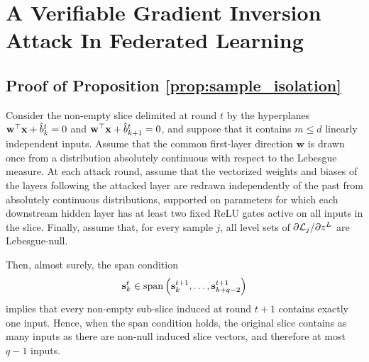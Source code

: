 \chapter{A Verifiable Gradient Inversion Attack In Federated Learning}

\section{Proof of Proposition \ref{prop:sample_isolation}}
\label{app:proof_prop1}

\begin{proposition}
Consider the non-empty slice delimited at round $t$ by the hyperplanes
$\mathbf w^\top {\mathbf{x}}+\hat b_k^t=0$ and $\mathbf w^\top {\mathbf{x}}+\hat b_{k+1}^t=0$,
and suppose that it contains $m\le d$ linearly independent inputs. Assume that
the common first-layer direction $\mathbf w$ is drawn once from a distribution
absolutely continuous with respect to the Lebesgue measure. At each attack round,
assume that the vectorized weights and biases of the layers following the
attacked layer are redrawn independently of the past from absolutely continuous
distributions, supported on parameters for which each downstream hidden layer
has at least two fixed ReLU gates active on all inputs in the slice. Finally,
assume that, for every sample $j$, all level sets of
$\partial \mathcal{L}_j/\partial z^L$ are Lebesgue-null.

Then, almost surely, the span condition
\[
\mathbf{s}_k^t
\in
\operatorname{span}\left(
\mathbf{s}_k^{t+1},\ldots,\mathbf{s}_{k+q-2}^{t+1}
\right)
\]
implies that every non-empty sub-slice induced at round $t+1$ contains exactly
one input. Hence, when the span condition holds, the original slice contains
as many inputs as there are non-null induced slice vectors, and therefore at
most $q-1$ inputs.
\end{proposition}



